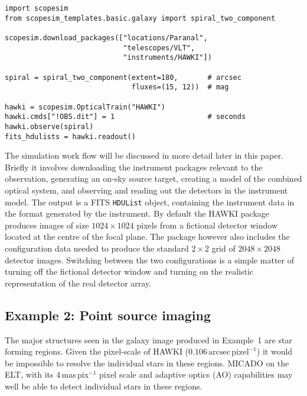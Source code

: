 \begin{lstlisting}[frame=single]
import scopesim
from scopesim_templates.basic.galaxy import spiral_two_component

scopesim.download_packages(["locations/Paranal",
                            "telescopes/VLT",
                            "instruments/HAWKI"])

spiral = spiral_two_component(extent=180,       # arcsec
                              fluxes=(15, 12))  # mag

hawki = scopesim.OpticalTrain("HAWKI")
hawki.cmds["!OBS.dit"] = 1                      # seconds
hawki.observe(spiral)
fits_hdulists = hawki.readout()
\end{lstlisting}

The simulation work flow will be discussed in more detail later in this paper.
Briefly it involves downloading the instrument packages relevant to the observation, generating an on-sky source target, creating a model of the combined optical system, and observing and reading out the detectors in the instrument model.
The output is a FITS \lstinline{HDUList} object, containing the instrument data in the format generated by the instrument.
By default the HAWKI package produces images of size $1024\times 1024$ pixels from a fictional detector window located at the centre of the focal plane.
The package however also includes the configuration data needed to produce the standard $2\times2$ grid of $2048\times 2048$ detector images.
Switching between the two configurations is a simple matter of turning off the fictional detector window and turning on the realistic representation of the real detector array.


\subsection{Example 2: Point source imaging}
\label{example-2-point-source-imaging}

The major structures seen in the galaxy image produced in Example~1 are star forming regions.
Given the pixel-scale of HAWKI ($0.106\,\mathrm{arcsec\,pixel^{-1}}$) it would be impossible to resolve the individual stars in these regions.
MICADO\cite{micado2018} on the ELT\cite{elt}, with its 4\,mas\,pix$^{-1}$ pixel scale and adaptive optics (AO) capabilities may well be able to detect individual stars in these regions.


